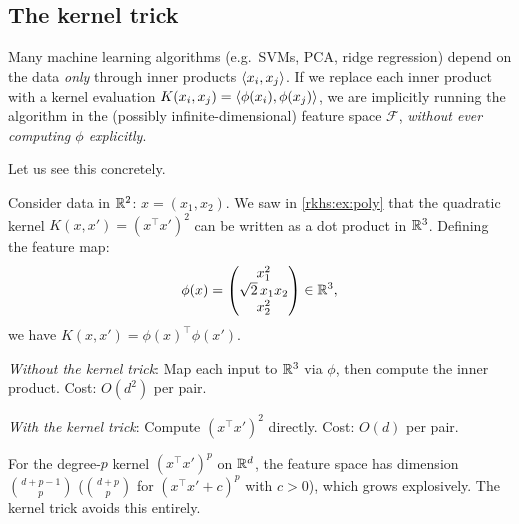 \begin{notechapter}
\subsection{The kernel trick}
\label{rkhs:subsec:kernel_trick}

\begin{keyidea}
Many machine learning algorithms (e.g.\ SVMs, PCA, ridge regression)
depend on the data \emph{only} through inner products
$\left\langle x_i, x_j \right\rangle$. If we replace each inner product with a kernel
evaluation $K(x_i, x_j) = \left\langle \phi(x_i), \phi(x_j) \right\rangle$, we are
implicitly running the algorithm in the (possibly infinite-dimensional)
feature space $\mathcal{F}$, \emph{without ever computing $\phi$
explicitly}.
\end{keyidea}

Let us see this concretely.

\begin{example}\label{rkhs:ex:kernel-trick}
Consider data in $\mathbb{R}^2$: $x = (x_1, x_2)$. We saw in
\cref{rkhs:ex:poly} that the quadratic kernel
$K(x,x') = (x^\top x')^2$ can be written as a dot
product in $\mathbb{R}^3$. Defining the feature map:
\[
\phi(x) = \begin{pmatrix} x_1^2 \\
\sqrt{2}\,x_1 x_2 \\ x_2^2
\end{pmatrix} \in \mathbb{R}^3,
\]
we have
$K(x,x') = \phi(x)^\top \phi(x')$.

\emph{Without the kernel trick}: Map each input to
$\mathbb{R}^3$ via $\phi$, then compute the inner product.
Cost: $O(d^2)$ per pair.

\emph{With the kernel trick}: Compute $(x^\top x')^2$
directly. Cost: $O(d)$ per pair.

For the degree-$p$ kernel $(x^\top x')^p$ on $\mathbb{R}^d$, the
feature space has dimension $\binom{d+p-1}{p}$
($\binom{d+p}{p}$ for $(x^\top x' + c)^p$ with $c > 0$), which
grows explosively. The kernel trick avoids this
entirely.
\end{example}

\begin{figure}[ht]
\centering
{}
\end{figure}
\end{notechapter}
